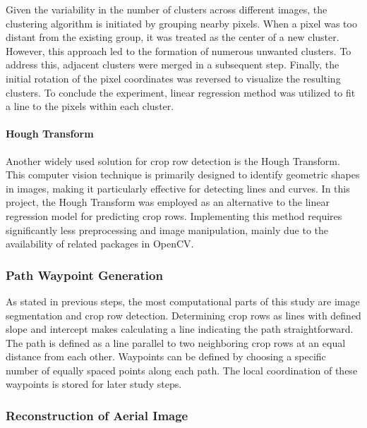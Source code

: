\documentclass[conference]{IEEEtran}
\begin{document}
	Given the variability in the number of clusters across different images, the clustering algorithm is initiated by grouping nearby pixels. When a pixel was too distant from the existing group, it was treated as the center of a new cluster. However, this approach led to the formation of numerous unwanted clusters. To address this, adjacent clusters were merged in a subsequent step. Finally, the initial rotation of the pixel coordinates was reversed to visualize the resulting clusters. To conclude the experiment, linear regression method was utilized to fit a line to the pixels within each cluster. 
	
	\paragraph{Hough Transform}\label{Hough Transform}\leavevmode
	
	Another widely used solution for crop row detection is the Hough Transform. This computer vision technique is primarily designed to identify geometric shapes in images, making it particularly effective for detecting lines and curves. In this project, the Hough Transform was employed as an alternative to the linear regression model for predicting crop rows. Implementing this method requires significantly less preprocessing and image manipulation, mainly due to the availability of related packages in OpenCV.
	
	\subsubsection{Path Waypoint Generation}\label{Path Waypoint Generation}\leavevmode
	
	As stated in previous steps, the most computational parts of this study are image segmentation and crop row detection. Determining crop rows as lines with defined slope and intercept makes calculating a line indicating the path straightforward. The path is defined as a line parallel to two neighboring crop rows at an equal distance from each other.
	Waypoints can be defined by choosing a specific number of equally spaced points along each path. The local coordination of these waypoints is stored for later study steps.
	
	\subsubsection{Reconstruction of Aerial Image}\label{Reconstruction of Aerial Image}\leavevmode
	
\end{document}
